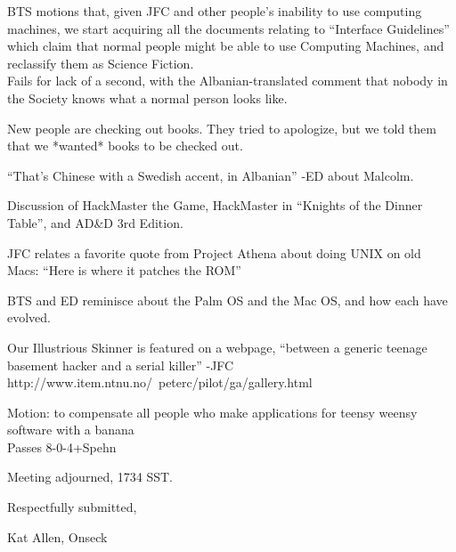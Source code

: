 \documentclass[10pt]{article}
\begin{document}
BTS motions that, given JFC and other people's inability to use
computing machines,  we start acquiring all the documents relating to
``Interface Guidelines'' which claim that normal people might be able
to use Computing Machines, and reclassify them as Science Fiction.\\
Fails for lack of a second, with the Albanian-translated comment that
nobody in the Society knows what a normal person looks like.

New people are checking out books. They tried to apologize, but we
told them that we *wanted* books to be checked out.

``That's Chinese with a Swedish accent, in Albanian'' -ED about
Malcolm.

Discussion of HackMaster the Game, HackMaster in ``Knights of the
Dinner Table'', and AD&D 3rd Edition.

JFC relates a favorite quote from Project Athena about doing UNIX on
old Macs: ``Here is where it patches the ROM''

BTS and ED reminisce about the Palm OS and the Mac OS, and how each
have evolved.

Our Illustrious Skinner is featured on a webpage, ``between a generic
       teenage basement hacker and a serial killer'' -JFC\\
       http://www.item.ntnu.no/~peterc/pilot/ga/gallery.html


Motion: to compensate all people who make applications for teensy
weensy software with a banana\\
Passes 8-0-4+Spehn

\vspace{12pt}

\noindent
Meeting adjourned, 1734 SST.

\vspace{18pt}

\centerline{Respectfully submitted,}
\centerline{Kat Allen,  Onseck}
\end{document}

